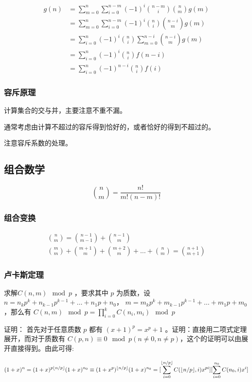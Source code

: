 \documentclass[UTF-8]{ctexart}
\begin{document}
	\begin{align}
	g(n)&=\sum_{m=0}^n\sum_{i=0}^{n-m}(-1)^i\binom{n-m}{i}\binom{n}{m}g(m)\nonumber\\
	&=\sum_{m=0}^n\sum_{i=0}^{n-m}(-1)^i\binom{n}{i}\binom{n-i}{m}g(m)\nonumber\\
	&=\sum_{i=0}^n(-1)^i\binom{n}{i}\sum_{m=0}^{n-i}\binom{n-i}{m}g(m)\nonumber\\
	&=\sum_{i=0}^n(-1)^i\binom{n}{i}f(n-i)\nonumber\\
	&=\sum_{i=0}^n(-1)^{n-i}\binom{n}{i}f(i)
	\end{align}
	
	\subsubsection{容斥原理}
	计算集合的交与并，主要注意不重不漏。
	
	通常考虑由计算不超过的容斥得到恰好的，或者恰好的得到不超过的。
	
	注意容斥系数的处理。
	\subsection{组合数学}
	$${n\choose m}=\frac{n!}{m!(n-m)!}$$
	\subsubsection{组合变换}
	\begin{align}
	{n \choose m}={n-1 \choose m-1}+{n-1 \choose m} \nonumber\\
	{m \choose m}+{m+1 \choose m}+{m+2 \choose m}+\dots+{n \choose m}={n+1 \choose m+1}\nonumber
	\end{align}
	\subsubsection{卢卡斯定理}
	求解$C(n,m) \mod{p}$ ，要求其中 $p$ 为质数，设$n=n _ k p ^ k+n _ {k-1} p ^ {k-1}+ \dots+n _ 1 p+n _ 0$， $m=m _ k p ^ k + m _ {k-1} p ^ { k-1} + \dots+m _ 1 p+m _ 0 $ ，那么有 $C(n,m) \mod{p} = \prod _ {i=0} ^ k C(n _ i,m _ i) \mod{p}$
	
	证明：	首先对于任意质数 $p$ 都有 $(x+1) ^ p=x ^ p +1$ 。证明：直接用二项式定理展开，而对于质数有 $C(p,n) \equiv 0 \mod{p} (n \neq0,n \neq p)$，这个的证明可以由展开直接得到。由此可得:  
	
	$$(1+x) ^ n =(1+x) ^ {p \lfloor n/p \rfloor}(1+x) ^ {n _ 0} \\\\ \equiv (1+x ^ p) ^ {\lfloor n/p \rfloor }(1+x) ^ {n _ 0} \\\\ =[\sum _ {i=0} ^ {\lfloor n/p \rfloor} C(\lfloor n/p \rfloor ,i) x ^ {pi}][\sum _ {i=0} ^ {n _ 0} C(n _ 0,i)x ^ i]$$
	
\end{document}
